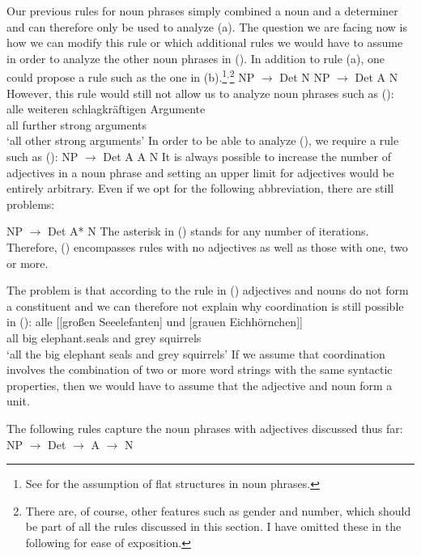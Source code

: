 Our previous rules for noun phrases simply combined a noun and a determiner and can therefore only be used to
analyze (a). The question we are facing now is how we can modify this rule or which additional rules we would
have to assume in order to analyze the other noun phrases in (). In addition to rule (a), one could propose 
a rule such as the one in (b).\footnote{%
	See  for the assumption of flat structures in noun phrases.
}$^,$\footnote{%
	There are, of course, other features such as gender and number, which should be part of all the rules
	discussed in this section. I have omitted these in the following for ease of exposition.
}
\eal
\ex NP $\to$ Det N
\ex NP $\to$ Det A N
\zl
However, this rule would still not allow us to analyze noun phrases such as ():
\ea
\label{Beispiel-alle-weitern-schlagkraeftigen-Argumente}
\gll alle weiteren schlagkräftigen Argumente\\
     all further strong arguments\\
\glt `all other strong arguments'
\z
In order to be able to analyze (), we require a rule such as (): 
\ea 
NP $\to$ Det A A N
\z
It is always possible to increase the number of adjectives in a noun phrase and setting an upper limit for
adjectives would be entirely arbitrary. Even if we opt for the following abbreviation, there are still problems:

\ea 
NP $\to$ Det A* N
\z
The asterisk\is{*} in () stands for any number of iterations. Therefore, () encompasses rules with no adjectives
as well as those with one, two or more.

The problem is that according to the rule in () adjectives and nouns do not form a constituent and we can therefore not explain why coordination 
is still possible in ():
\ea
\gll alle [[großen Seeelefanten] und [grauen Eichhörnchen]]\\
     all  \spacebr{}\spacebr{}big elephant.seals and  \spacebr{}grey squirrels\\
\glt `all the big elephant seals and grey squirrels'	 
\z
If we assume that coordination involves the combination of two or more word strings with the same syntactic properties, then we would have to assume
that the adjective and noun form a unit.

%
The following rules capture the noun phrases with adjectives discussed thus far:
\eal
\label{NP-Regeln}
\ex NP $\to$ Det \nbar
\ex\label{NP-Regeln-Adj} \nbar $\to$ A \nbar
\ex\label{NP-Regeln-Nbar-N} \nbar $\to$ N
\zl


